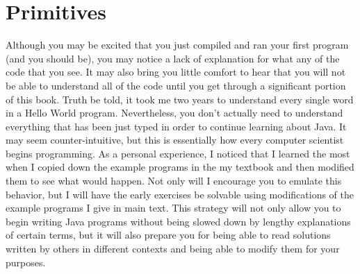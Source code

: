


\chapter{Primitives}


Although you may be excited that you just compiled and ran your first program (and you should be), you may notice a lack of explanation for what any of the code that you see.
It may also bring you little comfort to hear that you will not be able to understand all of the code until you get through a significant portion of this book.
Truth be told, it took me two years to understand every single word in a Hello World program.
Nevertheless, you don't actually need to understand everything that has been just typed in order to continue learning about Java.
It may seem counter-intuitive, but this is essentially how every computer scientist begins programming.
As a personal experience, I noticed that I learned the most when I copied down the example programs in the my textbook and then modified them to see what would happen.
Not only will I encourage you to emulate this behavior, but I will have the early exercises be solvable using modifications of the example programs I give in main text.
This strategy will not only allow you to begin writing Java programs without being slowed down by lengthy explanations of certain terms, but it will also prepare you for being able to read solutions written by others in different contexts and being able to modify them for your purposes.









